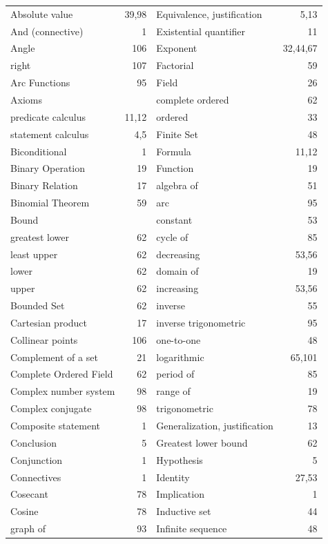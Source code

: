 \begin{tabular}{l r l r}
Absolute value &39,98 &Equivalence, justification &5,13\\
And (connective) &  1 &Existential quantifier &11\\
Angle  &   106 & Exponent & 32,44,67\\
\indent right & 107 &  Factorial &59\\
Arc Functions& 95& Field &26\\
Axioms && \indent complete ordered &62\\
\indent predicate calculus& 11,12& \indent ordered& 33\\
\indent statement calculus& 4,5 &  Finite Set& 48\\
Biconditional &1 &Formula& 11,12\\
Binary Operation& 19 &Function &19\\
Binary Relation &17 &\indent algebra of &51\\
Binomial Theorem &59& \indent arc& 95\\
Bound &&\indent constant& 53\\
\q greatest lower &62 &\q cycle of &85\\
\q least upper &62 &\q decreasing &53,56\\
\q lower &62 &\q domain of &19\\
\q upper &62 &\q increasing &53,56\\
Bounded Set& 62 &\q inverse &55\\
Cartesian product &17 &\q inverse trigonometric &95\\
Collinear points &106& \q one-to-one &48\\
Complement of a set& 21 &\q logarithmic &65,101\\
Complete Ordered Field& 62&\q period of &85\\
Complex number system &98 &\q range of& 19\\
Complex conjugate &98 &\q trigonometric& 78\\
Composite statement& 1& Generalization, justification &13 \\
Conclusion &5& Greatest lower bound &62\\
Conjunction& 1& Hypothesis &5\\
Connectives& 1 &Identity &27,53\\
Cosecant& 78 &Implication &1\\
Cosine &78& Inductive set &44\\
\q graph of& 93 &Infinite sequence &48\\

\end{tabular}
